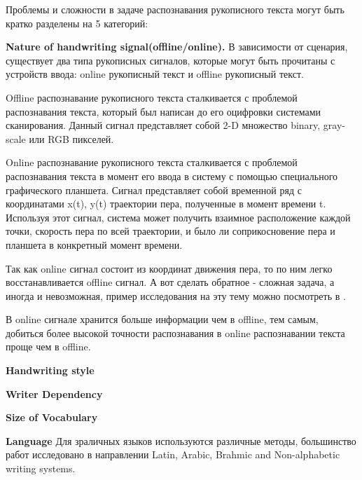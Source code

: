 Проблемы и сложности в задаче распознавания рукописного текста могут быть кратко разделены на 5 категорий:

\textbf{Nature of handwriting signal(offline/online).} В зависимости от сценария, существует два типа рукописных сигналов, которые могут быть прочитаны с  устройств ввода: online рукописный текст и offline рукописный текст.

Offline распознавание рукописного текста сталкивается с проблемой распознавания текста, который был написан до его оцифровки системами сканирования. Данный сигнал представляет собой 2-D множество binary, gray-scale или RGB пикселей.

Online распознавание рукописного текста сталкивается с проблемой распознавания текста в момент его ввода в систему с помощью специального графического планшета. Сигнал представляет собой временной ряд с координатами {x(t), y(t)} траектории пера, полученные в момент времени t. Используя этот сигнал, система может получить взаимное расположение каждой точки, скорость пера по всей траектории, и было ли соприкосновение пера и планшета в конкретный момент времени.

Так как online сигнал состоит из координат движения пера, то по ним легко восстанавливается offline сигнал. А вот сделать обратное - сложная задача, а иногда и невозможная, пример исследования на эту тему можно посмотреть в \cite{поцепаев2004восстановление}. 

В online сигнале хранится больше информации чем в offline, тем самым, добиться более высокой точности распознавания в online распознавании текста проще чем в offline. 

\textbf{Handwriting style}

\textbf{Writer Dependency}

\textbf{Size of Vocabulary}

\textbf{Language} Для зраличных языков используются различные методы, большинство работ исследовано в направлении Latin, Arabic, Brahmic and Non-alphabetic writing systems.
